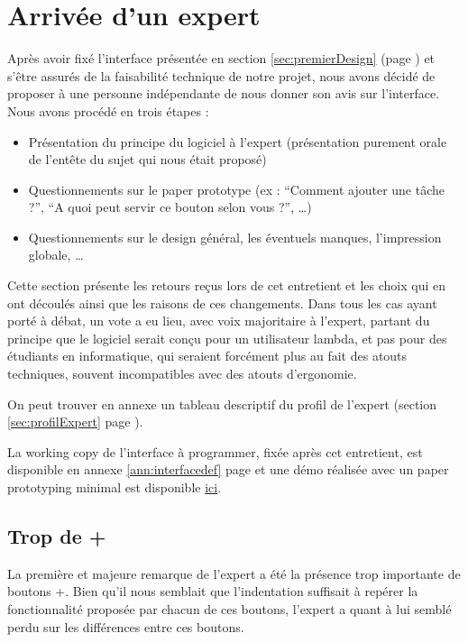 \documentclass[11pt]{article}
\begin{document}


\section{Arrivée d'un expert}

Après avoir fixé l'interface présentée en section
\ref{sec:premierDesign} (page \pageref{sec:premierDesign}) et s'être
assurés de la faisabilité technique de notre projet, nous avons décidé
de proposer à une personne indépendante de nous donner son avis sur
l'interface. Nous avons procédé en trois étapes :

\begin{itemize}
\item Présentation du principe du logiciel à l'expert (présentation
  purement orale de l'entête du sujet qui nous était proposé)
\item Questionnements sur le paper prototype (ex : ``Comment ajouter
  une tâche ?'', ``A quoi peut servir ce bouton selon vous ?'', \dots)
\item Questionnements sur le design général, les éventuels manques,
  l'impression globale, \dots
\end{itemize}

Cette section présente les retours reçus lors de cet entretient et les
choix qui en ont découlés ainsi que les raisons de ces changements.
Dans tous les cas ayant porté à débat, un vote a eu lieu, avec voix
majoritaire à l'expert, partant du principe que le logiciel serait
conçu pour un utilisateur lambda, et pas pour des étudiants en
informatique, qui seraient forcément plus au fait des atouts
techniques, souvent incompatibles avec des atouts d'ergonomie.

On peut trouver en annexe un tableau descriptif du profil de l'expert
(section \ref{sec:profilExpert} page \pageref{sec:profilExpert}).

La working copy de l'interface à programmer, fixée après cet
entretient, est disponible en annexe \ref{ann:interfacedef} page
\pageref{fig:interfacedefdessin} et une démo réalisée avec un paper
prototyping minimal est disponible
\href{http://daimrod.sbrk.org/demo-taser.MOV}{ici}.

\subsection{Trop de +}

La première et majeure remarque de l'expert a été la présence trop
importante de boutons +. Bien qu'il nous semblait que l'indentation
suffisait à repérer la fonctionnalité proposée par chacun de ces
boutons, l'expert a quant à lui semblé perdu sur les différences entre
ces boutons.
\end{document}
